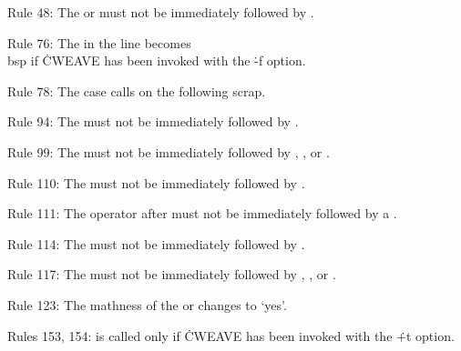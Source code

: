 Rule 48: The  or  must not be immediately
followed by .

Rule 76: The  in the  line becomes \\{bsp} if %
\.{CWEAVE} has
been invoked with the \.{-f} option.

Rule 78: The  case calls  on the
following scrap.

Rule 94: The  must not be immediately followed by .

Rule 99: The  must not be immediately followed by ,
, or .

Rule 110: The  must not be immediately followed by .

Rule 111: The operator after 
must not be immediately followed by a .

Rule 114: The  must not be immediately followed by
.

Rule 117: The  must not be immediately followed by , %
,
or .

Rule 123: The mathness of the  or  changes to `yes'.

Rules 153, 154:  is called only if \.{CWEAVE} has been
invoked
with the \.{+t} option.

